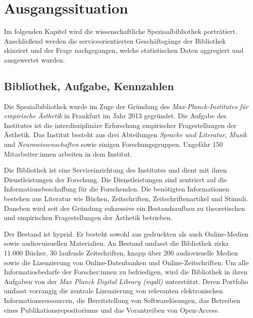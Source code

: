 \chapter{Ausgangssituation}

Im folgenden Kapitel wird die wissenschaftliche Spezioalbibliothek porträtiert. Anschließend werden die serviceorientierten Geschäftsgänge der
Bibliothek skizziert und der Frage nachgegangen, welche statistischen Daten aggregiert und ausgewertet wurden. 

\section{Bibliothek, Aufgabe, Kennzahlen}


Die Spezialbibliothek wurde im Zuge der Gründung des \textit{Max-Planck-Institutes für empirische Ästhetik} in Frankfurt im Jahr 2013 gegründet.
Die Aufgabe des Institutes ist die interdisziplinäre Erforschung empirischer Fragestellungen der Ästhetik. Das Institut besteht aus drei Abteilungen 
\textit{Sprache und Literatur}, \textit{Musik} und \textit{Neurowissenschaften} sowie einigen Forschungsgruppen. Ungefähr 150 Mitarbeiter:innen arbeiten 
in dem Institut. 

Die Bibliothek ist eine Serviceinrichtung des Institutes und dient mit ihren Dienstleistungen der Forschung.
Die Dienstleistungen sind zentriert auf die Informationsbeschaffung für die Forschenden. 
Die benötigten Informationen bestehen aus Literatur wie Büchen, Zeitschriften, Zeitschriftenartikel und Stimuli.
Daneben wird seit der Gründung sukzessive ein Bestandsaufbau zu theoretischen und empirischen Fragestellungen der Ästhetik betrieben.

Der Bestand ist hyprid. Er besteht sowohl aus gedruckten als auch Online-Medien sowie audiovuisuellen Materialien.
An Bestand umfasst die Bibliothek zirka 11.000 Bücher, 30 laufende Zeitschriften, knapp über 200 audiovisuelle Medien sowie die Lizenzierung von Online-Datenbanken
und Online-Zeitschriften.
Um alle Informatiosbedarfe der Forscher:innen zu befriedigen, wird die Bibliothek in ihren Aufgaben von der
\textit{Max Planck Digital Library (mpdl)} unterstützt. Deren Portfolio umfasst vorrangig die zentrale Lizenzierung
von relevanten elektronischen Informationsressourcen, die Bereitstellung
von Softwarelösungen, das Betreiben eines Publikationsrepositoriums und
das Vorantreiben von Open-Access. 


